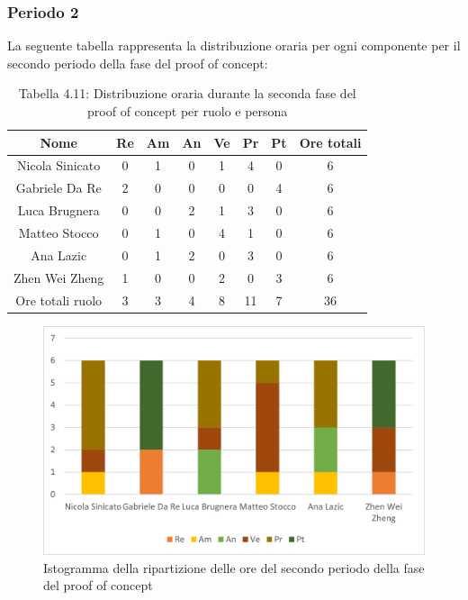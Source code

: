 \subsubsection{Periodo 2}
%
La seguente tabella rappresenta la distribuzione oraria per ogni componente per il secondo periodo della fase del proof of concept:
\begin{table}[h]
	\setlength\extrarowheight{5pt}
	\centering
	\begin{tabularx}{\textwidth}{|ccccccc|c|}
		\hline
		\rowcolor{white}
		\textbf{Nome} & \textbf{Re} & \textbf{Am} & \textbf{An} & \textbf{Ve} & \textbf{Pr}& \textbf{Pt} & \textbf{Ore totali} \\
		\hline
		Nicola Sinicato &0&1&0&1&4&0&6 \\
		Gabriele Da Re &2&0&0&0&0&4&6 \\
		Luca Brugnera &0&0&2&1&3&0&6 \\
		Matteo Stocco &0&1&0&4&1&0&6 \\
		Ana Lazic &0&1&2&0&3&0&6 \\
		Zhen Wei Zheng &1&0&0&2&0&3&6 \\
		\hline
		Ore totali ruolo &3&3&4&8&11&7&36 \\
		\hline
	\end{tabularx}
	\vspace{10pt}
	\caption{Tabella 4.11: Distribuzione oraria durante la seconda fase del proof of concept per ruolo e persona}
\end{table}
\begin{figure}[H]
    \centering
    \includegraphics[scale=0.6]{img/grafi preventivo/istogrammi/proof/periodo2.png}
    \caption{Istogramma della ripartizione delle ore del secondo periodo della fase del proof of concept}
\end{figure}

